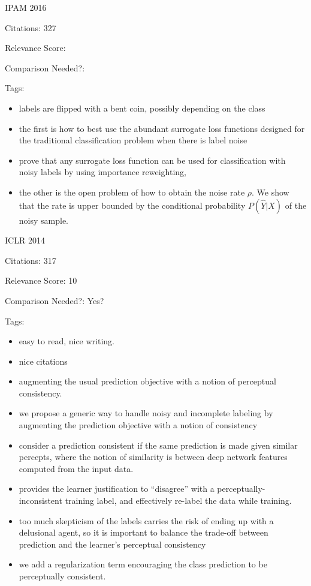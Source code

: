 \documentclass[11pt]{article}
\begin{document}
\vspace{2cm}

\noindent IPAM 2016

\noindent Citations: 327

\noindent Relevance Score: 

\noindent Comparison Needed?: 

\noindent Tags:

\begin{itemize}
\item labels are flipped with a bent coin, possibly depending on the class
\item the first is how to best use the abundant surrogate loss functions designed for the traditional classification problem when there is label noise
\item  prove that any surrogate loss function can be used for classification with noisy labels by using importance reweighting,
\item the other is the open problem of how to obtain the noise rate $\rho$. We show that the rate is upper bounded by the conditional probability $P(\hat{Y} |X)$ of the noisy sample.
\end{itemize}

\vspace{2cm}

\noindent ICLR 2014

\noindent Citations: 317

\noindent Relevance Score: 10

\noindent Comparison Needed?: Yes?

\noindent Tags:

\begin{itemize}
\item easy to read, nice writing.
\item nice citations
\item augmenting the usual prediction objective with a notion of perceptual consistency.
\item we propose a generic way to handle noisy and incomplete labeling by augmenting the prediction objective with a notion of consistency
\item consider a prediction consistent if the same prediction is made given similar percepts, where the notion of similarity is between deep network features computed from the input data.
\item provides the learner justification to “disagree” with a perceptually-inconsistent training label, and effectively re-label the data while training.
\item too much skepticism of the labels carries the risk of ending up with a delusional agent, so it is important to balance the trade-off between prediction and the learner’s perceptual consistency
\item we add a regularization term encouraging the class prediction to be perceptually consistent.
\end{itemize}
\end{document}
